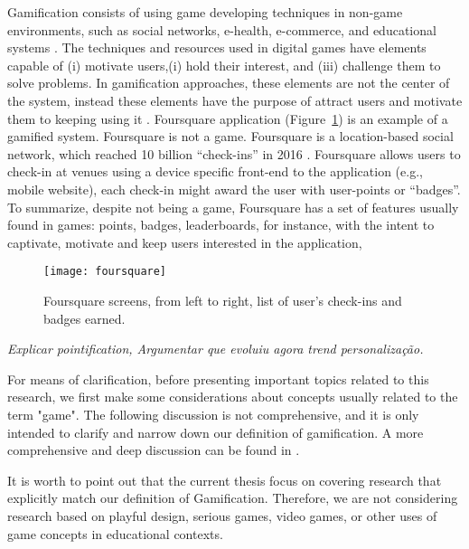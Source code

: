 
Gamification consists of using game developing techniques in non-game environments, such as social networks, e-health, e-commerce, and educational systems \cite{kapp2012gamification,Deterding2011,Gamification_definition}. The techniques and resources used in digital games have elements
capable of (i) motivate users,(i) hold their interest, and (iii) challenge them
to solve problems. In gamification approaches, these elements are
not the center of the system, instead these elements have the purpose of attract users and motivate them to keeping using it \cite{Deterding2011}. Foursquare application (Figure~\ref{fig:foursquere}) is an
example of a gamified system. Foursquare is not a game. Foursquare is a location-based
social network, which reached 10 billion “check-ins” in 2016 \cite{Blankfeld2017forbes}.
Foursquare allows users to check-in at venues using a device specific
front-end to the application (e.g., mobile website), each
check-in might award the user with user-points or “badges”. To summarize, despite not being a game, Foursquare has a set of features usually found in games: points, badges, leaderboards, for instance, with the intent to captivate, motivate and keep users interested in the application, 

\begin{figure}[h!]
\caption{Foursquare screens, from left to right, list of user's check-ins and badges earned. }
\centering
\texttt{[image: foursquare]}
\label{fig:foursquere}
\end{figure}

\textit{Explicar pointification, 
Argumentar que evoluiu agora trend personalização.}

For means of clarification, before presenting important topics related to this research, we first make some considerations about concepts usually related to the term "game". The following discussion is not comprehensive, and it is only intended to clarify and narrow down our definition of gamification. A more comprehensive and deep discussion can be found in \citeauthor{Deterding2011}.


It is worth to point out that the current thesis focus on covering research that explicitly match our definition of Gamification.
Therefore, we are not considering research based on playful design, serious games, video games, or other uses of game concepts in educational contexts.

